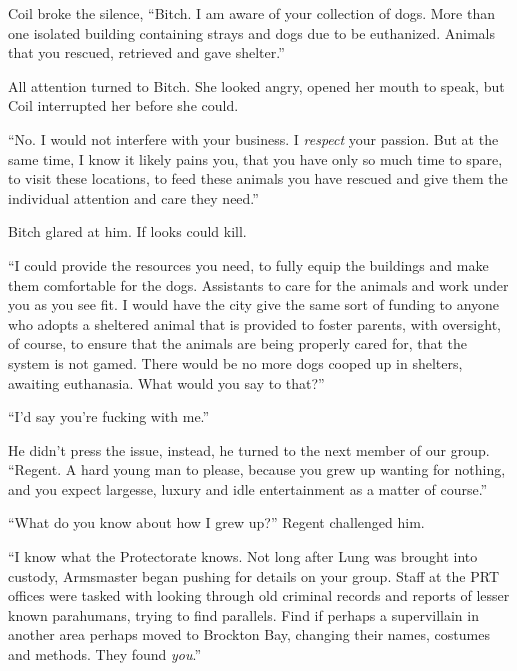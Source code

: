 Coil broke the silence, ``Bitch.  I am aware of your collection of dogs.  More than one isolated building containing strays and dogs due to be euthanized.  Animals that you rescued, retrieved and gave shelter.''



All attention turned to Bitch.  She looked angry, opened her mouth to speak, but Coil interrupted her before she could.



``No.  I would not interfere with your business.  I \emph{respect} your passion.  But at the same time, I know it likely pains you, that you have only so much time to spare, to visit these locations, to feed these animals you have rescued and give them the individual attention and care they need.''



Bitch glared at him.  If looks could kill.



``I could provide the resources you need, to fully equip the buildings and make them comfortable for the dogs.  Assistants to care for the animals and work under you as you see fit.  I would have the city give the same sort of funding to anyone who adopts a sheltered animal that is provided to foster parents, with oversight, of course, to ensure that the animals are being properly cared for, that the system is not gamed.  There would be no more dogs cooped up in shelters, awaiting euthanasia.  What would you say to that?''



``I'd say you're fucking with me.''



He didn't press the issue, instead, he turned to the next member of our group.  ``Regent.  A hard young man to please, because you grew up wanting for nothing, and you expect largesse, luxury and idle entertainment as a matter of course.''



``What do you know about how I grew up?'' Regent challenged him.



``I know what the Protectorate knows.  Not long after Lung was brought into custody, Armsmaster began pushing for details on your group.  Staff at the PRT offices were tasked with looking through old criminal records and reports of lesser known parahumans, trying to find parallels.  Find if perhaps a supervillain in another area perhaps moved to Brockton Bay, changing their names, costumes and methods.  They found \emph{you}.''



